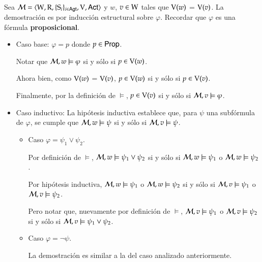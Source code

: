 \begin{demostracion}
    Sea $\mathcal{M}=\langle \mathrm{W},\mathrm{R},\{ \mathrm{S}_i \}_{i \in {\rm \sf Agt}},\mathrm{V},{\rm \sf Act} \rangle$ y $w$, $v \in \mathrm{W}$
    tales que $\mathrm{V}(w)$ = $\mathrm{V}(v)$. La demostración es por inducción estructural sobre $\varphi$. 
    Recordar que $\varphi$ es una fórmula \textbf{proposicional}.

    \begin{itemize}
        \item Caso base: $\varphi = p$ donde $p \in {\rm \sf Prop}$.

        Notar que  $\mathcal{M}, w \models \varphi$ si y sólo si $p \in \mathrm{V}(w)$.

        Ahora bien, como $\mathrm{V}(w)$ = $\mathrm{V}(v)$, $p \in \mathrm{V}(w)$ si y sólo si $p \in \mathrm{V}(v)$.

        Finalmente, por la definición de $\models$, $p \in \mathrm{V}(v)$ si y sólo si $\mathcal{M}, v \models \varphi$.  
    
        \item Caso inductivo: La hipótesis inductiva establece que, para $\psi$ una subfórmula de $\varphi$, 
        se cumple que $\mathcal{M}, w \models \psi$ si y sólo si $\mathcal{M}, v \models \psi$.

        \begin{itemize}
            \item Caso $\varphi = \psi_1 \lor \psi_2$. 
    
            Por definición de $\models$, $\mathcal{M}, w \models \psi_1 \lor \psi_2$ si y sólo si $\mathcal{M},
            w \models \psi_1$ o $\mathcal{M}, w \models \psi_2$.
            
            Por hipótesis inductiva, $\mathcal{M}, w \models \psi_1$ o $\mathcal{M}, w \models \psi_2 $ si y sólo
            si $\mathcal{M}, v \models \psi_1$ o $\mathcal{M}, v \models \psi_2$. 
            
            Pero notar que, nuevamente por definición de $\models$, $\mathcal{M}, v \models \psi_1$ o $\mathcal{M},
            v \models \psi_2$ si y sólo si $\mathcal{M},v \models \psi_1 \lor \psi_2$.  

            \item Caso $\varphi = \neg \psi$.
        
            La demostración es similar a la del caso analizado anteriormente.
        \end{itemize}
    
    \end{itemize}
    
\end{demostracion}

